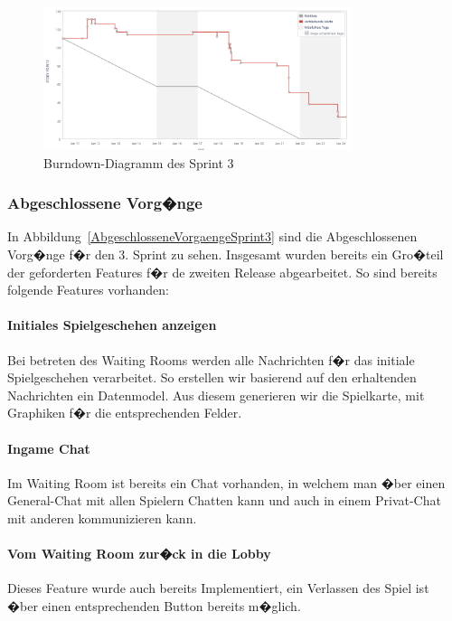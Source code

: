 \documentclass[12pt, titlepage]{scrartcl}
\newcommand{\Abb}[1]{%
	Abbildung\ \ref{#1}%
}
\begin{document}
		\begin{figure}[H] 
			\centering
			\includegraphics[width=0.8\textwidth]{BurndownChart_Sprint3.PNG}
			\caption{Burndown-Diagramm des Sprint 3}
			\label{BurndownSprint3}
		\end{figure}
		
		\subsubsection{Abgeschlossene Vorg�nge}
		
		In \Abb{AbgeschlosseneVorgaengeSprint3} sind die Abgeschlossenen Vorg�nge f�r den 3. Sprint zu sehen. Insgesamt wurden bereits ein Gro�teil der geforderten Features f�r de zweiten Release abgearbeitet. So sind bereits folgende Features vorhanden:
		
		\paragraph{Initiales Spielgeschehen anzeigen} Bei betreten des Waiting Rooms werden alle Nachrichten f�r das initiale Spielgeschehen verarbeitet. So erstellen wir basierend auf den erhaltenden Nachrichten ein Datenmodel. Aus diesem generieren wir die Spielkarte, mit Graphiken f�r die entsprechenden Felder.
		
		\paragraph{Ingame Chat}
		Im Waiting Room ist bereits ein Chat vorhanden, in welchem man �ber einen General-Chat mit allen Spielern Chatten kann und auch in einem Privat-Chat mit anderen kommunizieren kann.
		
		\paragraph{Vom Waiting Room zur�ck in die Lobby}
		Dieses Feature wurde auch bereits Implementiert, ein Verlassen des Spiel ist �ber einen entsprechenden Button bereits m�glich.
		
\end{document}

